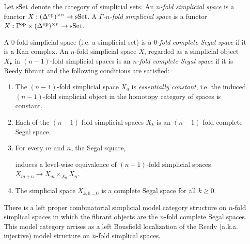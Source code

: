 \documentclass{amsart}
\begin{document}
\begin{definition}
	Let $\mathrm{sSet}$ denote the category of simplicial sets. An {\em $n$-fold simplicial space} is a functor $X: (\Delta^\textrm{op})^{\times n} \to \mathrm{sSet}$. A {\em $\Gamma$-$n$-fold simplicial space} is a functor $X: \Gamma^\textrm{op} \times (\Delta^\textrm{op})^{\times n} \to \mathrm{sSet}$.
\end{definition}

\begin{definition}
		A $0$-fold simplicial space (i.e. a simplicial set) is a {\em $0$-fold complete Segal space} if it is a Kan complex. An $n$-fold simplicial space $X$, regarded as a simplicial object $X_\bullet$ in $(n-1)$-fold simplicial spaces is an {\em $n$-fold complete Segal space} if it is Reedy fibrant and the following conditions are satisfied:
		\begin{enumerate}
			\item The $(n-1)$-fold simplicial space $X_0$ is {\em essentially constant}, i.e. the induced $(n-1)$-fold simplicial object in the homotopy category of spaces is constant. 
			\item Each of the $(n-1)$-fold simplicial spaces $X_k$ is an $(n-1)$-fold complete Segal space.
			\item For every $m$ and $n$, the Segal square,
			\begin{center}
			\end{center}
			induces a level-wise 
			equivalence of $(n-1)$-fold simplicial spaces $X_{m+n} \to X_m \times_{X_0} X_n$.
			\item The simplicial space $X_{k, 0 \dots, 0}$ is a complete Segal space for all $k\geq 0$. 
		\end{enumerate}
\end{definition}

\begin{theorem}
	There is a left proper combinatorial simplicial model category structure on $n$-fold simplical spaces in which the fibrant objects are the $n$-fold complete Segal spaces. This model category arrises as a left Bousfield localization of the Reedy (a.k.a. injective) model structure on $n$-fold simplical spaces. 
\end{theorem}
\end{document}
